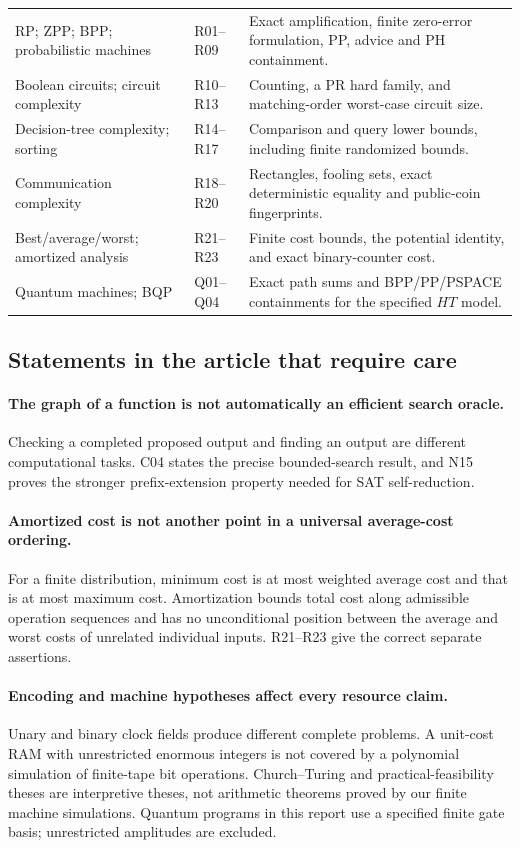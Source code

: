 \begin{longtable}{p{}p{}p{}}
RP; ZPP; BPP; probabilistic machines & R01--R09 & Exact amplification, finite zero-error formulation, PP, advice and PH containment. \\
Boolean circuits; circuit complexity & R10--R13 & Counting, a PR hard family, and matching-order worst-case circuit size. \\
Decision-tree complexity; sorting & R14--R17 & Comparison and query lower bounds, including finite randomized bounds. \\
Communication complexity & R18--R20 & Rectangles, fooling sets, exact deterministic equality and public-coin fingerprints. \\
Best/average/worst; amortized analysis & R21--R23 & Finite cost bounds, the potential identity, and exact binary-counter cost. \\
Quantum machines; BQP & Q01--Q04 & Exact path sums and BPP/PP/PSPACE containments for the specified $HT$ model. \\
\bottomrule
\end{longtable}

\subsection{Statements in the article that require care}
\paragraph{The graph of a function is not automatically an efficient search oracle.}
Checking a completed proposed output and finding an output are different computational tasks. C04 states the precise bounded-search result, and N15 proves the stronger prefix-extension property needed for SAT self-reduction.

\paragraph{Amortized cost is not another point in a universal average-cost ordering.}
For a finite distribution, minimum cost is at most weighted average cost and that is at most maximum cost. Amortization bounds total cost along admissible operation sequences and has no unconditional position between the average and worst costs of unrelated individual inputs. R21--R23 give the correct separate assertions.

\paragraph{Encoding and machine hypotheses affect every resource claim.}
Unary and binary clock fields produce different complete problems. A unit-cost RAM with unrestricted enormous integers is not covered by a polynomial simulation of finite-tape bit operations. Church--Turing and practical-feasibility theses are interpretive theses, not arithmetic theorems proved by our finite machine simulations. Quantum programs in this report use a specified finite gate basis; unrestricted amplitudes are excluded.

